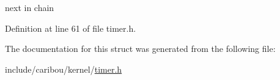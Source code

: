 next in chain 



Definition at line 61 of file timer.\-h.



The documentation for this struct was generated from the following file\-:\begin{DoxyCompactItemize}
\item 
include/caribou/kernel/\hyperlink{timer_8h}{timer.\-h}\end{DoxyCompactItemize}
